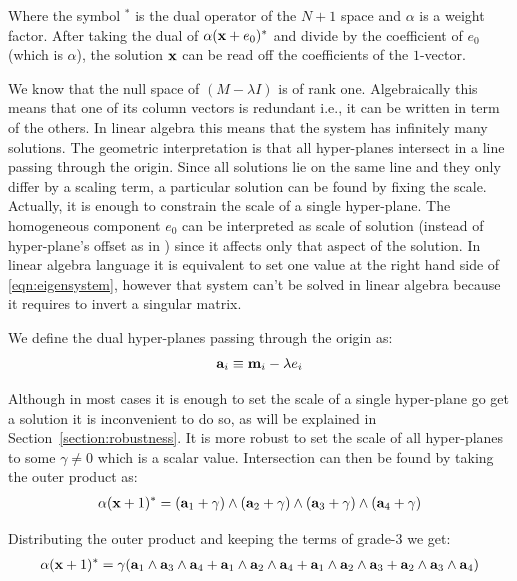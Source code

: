 \documentclass{birkjour}
\numberwithin{equation}{section}
\begin{document}
Where the symbol $^*$ is the dual operator of the $N+1$ space and $\alpha$ is a weight factor. After taking the dual of $\alpha (\textbf x + e_0)^*$ and divide by the coefficient of $e_0$ (which is $\alpha$), the solution $\textbf x$ can be read off the coefficients of the $1$-vector.

We know that the null space of $(M - \lambda I)$ is of rank one. Algebraically this means that one of its column vectors is redundant i.e., it can be written in term of the others. In linear algebra this means that the system has infinitely many solutions. The geometric interpretation is that all hyper-planes intersect in a line passing through the origin. Since all solutions lie on the same line and they only differ by a scaling term, a particular solution can be found by fixing the scale. Actually, it is enough to constrain the scale of a single hyper-plane. The homogeneous component $e_0$ can be interpreted as scale of solution (instead of hyper-plane's offset as in \cite{DeKeninck2019}) since it affects only that aspect of the solution. In linear algebra language it is equivalent to set one value at the right hand side of \ref{eqn:eigensystem}, however that system can't be solved in linear algebra because it requires to invert a singular matrix.

We define the dual hyper-planes passing through the origin as:
\begin{eqnarray}
   \textbf a_i \equiv \textbf m_i - \lambda e_i
\end{eqnarray}

Although in most cases it is enough to set the scale of a single hyper-plane go get a solution it is inconvenient to do so, as will be explained in Section~\ref{section:robustness}. It is more robust to set the scale of all hyper-planes to some $\gamma \neq 0$ which is a scalar value. Intersection can then be found by taking the outer product as:
\begin{eqnarray}
\label{eqn:hyperplanes_intersection}
\alpha (\textbf x + 1)^* = (\textbf a_1 + \gamma) \wedge  (\textbf a_2 + \gamma) \wedge  (\textbf a_3  + \gamma) \wedge (\textbf a_4 + \gamma)
\end{eqnarray}

Distributing the outer product and keeping the terms of grade-$3$ we get:
\begin{eqnarray}
\alpha (\textbf x + 1)^* =  \gamma (\textbf a_1 \wedge \textbf a_3 \wedge \textbf a_4
+ \textbf a_1 \wedge \textbf a_2 \wedge \textbf a_4
+ \textbf a_1 \wedge \textbf a_2 \wedge \textbf a_3
+ \textbf a_2 \wedge \textbf a_3 \wedge \textbf a_4)
\end{eqnarray}
\end{document}
